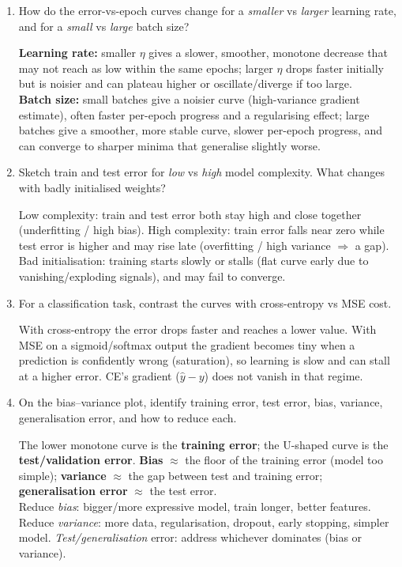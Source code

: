 \documentclass[10pt,a4paper]{article}
\newcommand{\q}[1]{\item #1}
\begin{document}
\begin{enumerate}[leftmargin=*,label=\textbf{Q\arabic*.}]

\q How do the error-vs-epoch curves change for a \emph{smaller} vs \emph{larger} learning rate, and for a \emph{small} vs \emph{large} batch size?
\begin{answerbox}
\textbf{Learning rate:} smaller $\eta$ gives a slower, smoother, monotone decrease that may not reach as low within the same epochs; larger $\eta$ drops faster initially but is noisier and can plateau higher or oscillate/diverge if too large.\\
\textbf{Batch size:} small batches give a noisier curve (high-variance gradient estimate), often faster per-epoch progress and a regularising effect; large batches give a smoother, more stable curve, slower per-epoch progress, and can converge to sharper minima that generalise slightly worse.
\end{answerbox}

\q Sketch train and test error for \emph{low} vs \emph{high} model complexity. What changes with badly initialised weights?
\begin{answerbox}
Low complexity: train and test error both stay high and close together (underfitting / high bias). High complexity: train error falls near zero while test error is higher and may rise late (overfitting / high variance $\Rightarrow$ a gap). Bad initialisation: training starts slowly or stalls (flat curve early due to vanishing/exploding signals), and may fail to converge.
\end{answerbox}

\q For a classification task, contrast the curves with cross-entropy vs MSE cost.
\begin{answerbox}
With cross-entropy the error drops faster and reaches a lower value. With MSE on a sigmoid/softmax output the gradient becomes tiny when a prediction is confidently wrong (saturation), so learning is slow and can stall at a higher error. CE's gradient ($\hat y - y$) does not vanish in that regime.
\end{answerbox}

\q On the bias--variance plot, identify training error, test error, bias, variance, generalisation error, and how to reduce each.
\begin{answerbox}
The lower monotone curve is the \textbf{training error}; the U-shaped curve is the \textbf{test/validation error}. \textbf{Bias} $\approx$ the floor of the training error (model too simple); \textbf{variance} $\approx$ the gap between test and training error; \textbf{generalisation error} $\approx$ the test error.\\
Reduce \emph{bias}: bigger/more expressive model, train longer, better features. Reduce \emph{variance}: more data, regularisation, dropout, early stopping, simpler model. \emph{Test/generalisation} error: address whichever dominates (bias or variance).
\end{answerbox}


\end{enumerate}
\end{document}
